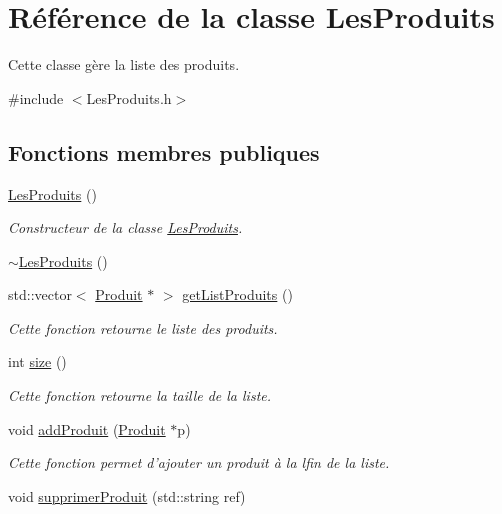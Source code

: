 \hypertarget{class_les_produits}{\section{Référence de la classe Les\-Produits}
\label{class_les_produits}
}


Cette classe gère la liste des produits.  




{\ttfamily \#include $<$Les\-Produits.\-h$>$}

\subsection*{Fonctions membres publiques}
\begin{DoxyCompactItemize}
\item 
\hyperlink{class_les_produits_ab8737b898ee32a9c2dc1981a0e0de4d4}{Les\-Produits} ()
\begin{DoxyCompactList}\small\item\em Constructeur de la classe \hyperlink{class_les_produits}{Les\-Produits}. \end{DoxyCompactList}\item 
\hyperlink{class_les_produits_afc38b647d42702bc895a14b42569d6fd}{$\sim$\-Les\-Produits} ()
\item 
std\-::vector$<$ \hyperlink{class_produit}{Produit} $\ast$ $>$ \hyperlink{class_les_produits_a0661c759a71e21ed568a9be3dc94a113}{get\-List\-Produits} ()
\begin{DoxyCompactList}\small\item\em Cette fonction retourne le liste des produits. \end{DoxyCompactList}\item 
int \hyperlink{class_les_produits_a471eb88643711b1c31c9c7fa1f2e4457}{size} ()
\begin{DoxyCompactList}\small\item\em Cette fonction retourne la taille de la liste. \end{DoxyCompactList}\item 
void \hyperlink{class_les_produits_a3ea4175a854859e98f357f843fe68813}{add\-Produit} (\hyperlink{class_produit}{Produit} $\ast$p)
\begin{DoxyCompactList}\small\item\em Cette fonction permet d'ajouter un produit à la lfin de la liste. \end{DoxyCompactList}\item 
void \hyperlink{class_les_produits_a09ff9e0b52cb6a62228a7a7f6fc04a37}{supprimer\-Produit} (std\-::string ref)

\end{DoxyCompactItemize}
